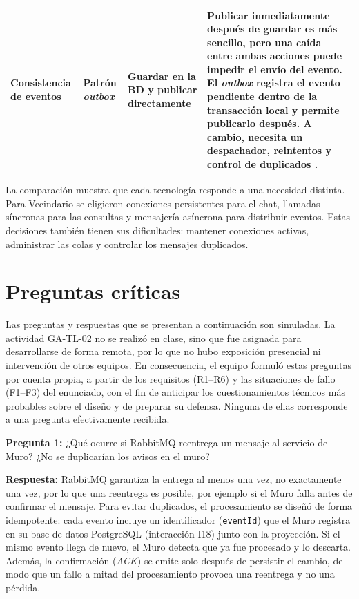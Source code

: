 \documentclass[12pt,a4paper]{article}
\begin{document}
\begin{longtable}{@{}p{2.1cm}p{2.5cm}p{2.8cm}p{6.4cm}@{}}
\midrule

Consistencia
de eventos &
Patrón
\textit{outbox} &
Guardar en la BD
y publicar directamente &
Publicar inmediatamente después de guardar es
más sencillo, pero una caída entre ambas acciones
puede impedir el envío del evento. El
\textit{outbox} registra el evento pendiente
dentro de la transacción local y permite
publicarlo después. A cambio, necesita un
despachador, reintentos y control de duplicados
\cite{gupta2025outbox,bacao2026consistency}. \\

\bottomrule
\end{longtable}

La comparación muestra que cada tecnología responde a una
necesidad distinta. Para Vecindario se eligieron conexiones
persistentes para el chat, llamadas síncronas para las consultas
y mensajería asíncrona para distribuir eventos. Estas decisiones
también tienen sus dificultades: mantener conexiones activas,
administrar las colas y controlar los mensajes duplicados.





\section{Preguntas críticas}

Las preguntas y respuestas que se presentan a continuación son simuladas. La
actividad GA-TL-02 no se realizó en clase, sino que fue asignada para
desarrollarse de forma remota, por lo que no hubo exposición presencial ni
intervención de otros equipos. En consecuencia, el equipo formuló estas
preguntas por cuenta propia, a partir de los requisitos (R1--R6) y las
situaciones de fallo (F1--F3) del enunciado, con el fin de anticipar los
cuestionamientos técnicos más probables sobre el diseño y de preparar su
defensa. Ninguna de ellas corresponde a una pregunta efectivamente recibida.

\textbf{Pregunta 1:} ¿Qué ocurre si RabbitMQ reentrega un mensaje al servicio de
Muro? ¿No se duplicarían los avisos en el muro?

\textbf{Respuesta:} RabbitMQ garantiza la entrega al menos una vez, no
exactamente una vez, por lo que una reentrega es posible, por ejemplo si el
Muro falla antes de confirmar el mensaje. Para evitar duplicados, el
procesamiento se diseñó de forma idempotente: cada evento incluye un
identificador (\texttt{eventId}) que el Muro registra en su base de datos
PostgreSQL (interacción I18) junto con la proyección. Si el mismo evento llega
de nuevo, el Muro detecta que ya fue procesado y lo descarta. Además, la
confirmación (\textit{ACK}) se emite solo después de persistir el cambio, de
modo que un fallo a mitad del procesamiento provoca una reentrega y no una
pérdida.
\end{document}
